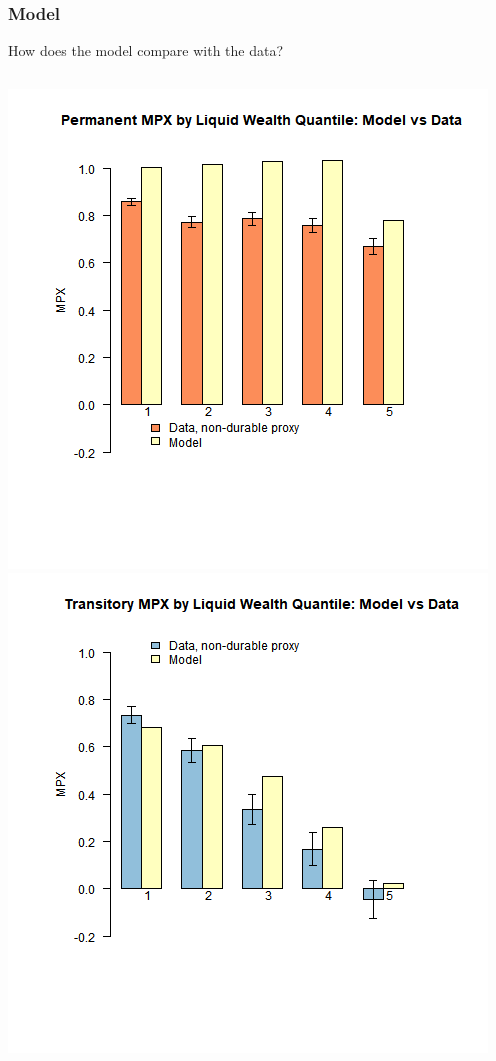 \documentclass{beamer}
\begin{document}
{
	\frametitle{Model}
	How does the model compare with the data?
	\begin{columns}
	\centering
	\includegraphics[scale=0.35]{../Figures/CSTW_perm_denmark.png}
	\centering
	\includegraphics[scale=0.35]{../Figures/CSTW_tran_denmark.png}
	\end{columns} 
}
\end{document}
